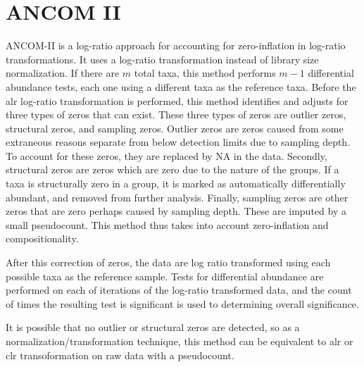 \documentclass[
]{book}
\begin{document}
\hypertarget{ancom-ii}{%
\section{ANCOM II}\label{ancom-ii}}

ANCOM-II \citep{kaul2017} is a log-ratio approach for accounting for zero-inflation in log-ratio transformations. It uses a log-ratio transformation instead of library size normalization. If there are \(m\) total taxa, this method performs \(m-1\) differential abundance tests, each one using a different taxa as the reference taxa. Before the alr log-ratio transformation is performed, this method identifies and adjusts for three types of zeros that can exist. These three types of zeros are outlier zeros, structural zeros, and sampling zeros. Outlier zeros are zeros caused from some extraneous reasons separate from below detection limits due to sampling depth. To account for these zeros, they are replaced by NA in the data. Secondly, structural zeros are zeros which are zero due to the nature of the groups. If a taxa is structurally zero in a group, it is marked as automatically differentially abundant, and removed from further analysis. Finally, sampling zeros are other zeros that are zero perhaps caused by sampling depth. These are imputed by a small pseudocount. This method thus takes into account zero-inflation and compositionality.

After this correction of zeros, the data are log ratio transformed using each possible taxa as the reference sample. Tests for differential abundance are performed on each of iterations of the log-ratio transformed data, and the count of times the resulting test is significant is used to determining overall significance.

It is possible that no outlier or structural zeros are detected, so as a normalization/transformation technique, this method can be equivalent to alr or clr transoformation on raw data with a pseudocount.
\end{document}
